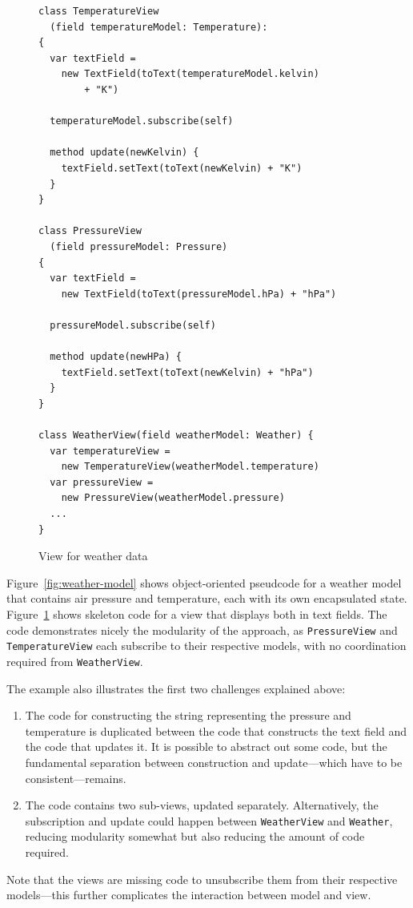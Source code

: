 \documentclass[sigplan,review,screen]{acmart}
\begin{document}
\begin{figure}[tb]
\begin{verbatim}
class TemperatureView
  (field temperatureModel: Temperature):
{
  var textField =
    new TextField(toText(temperatureModel.kelvin)
        + "K")

  temperatureModel.subscribe(self)

  method update(newKelvin) {
    textField.setText(toText(newKelvin) + "K")
  }
}

class PressureView
  (field pressureModel: Pressure)
{
  var textField =
    new TextField(toText(pressureModel.hPa) + "hPa")

  pressureModel.subscribe(self)

  method update(newHPa) {
    textField.setText(toText(newKelvin) + "hPa")
  }
}

class WeatherView(field weatherModel: Weather) {
  var temperatureView =
    new TemperatureView(weatherModel.temperature)
  var pressureView =
    new PressureView(weatherModel.pressure)
  ...
}
\end{verbatim}
  \caption{View for weather data}
  \label{fig:weather-view}
\end{figure}
%
Figure~\ref{fig:weather-model} shows object-oriented pseudcode for a
weather model that contains air pressure and temperature, each with
its own encapsulated state.  Figure~\ref{fig:weather-view} shows
skeleton code for a view that displays both in text fields.  The code
demonstrates nicely the modularity of the approach, as
\texttt{PressureView} and \texttt{TemperatureView} each subscribe to
their respective models, with no coordination required from
\texttt{WeatherView}.

The example also illustrates the first two challenges explained above:
%
\begin{enumerate}
\item The code for constructing the string representing the pressure
  and temperature is duplicated between the code that constructs the
  text field and the code that updates it.  It is possible to abstract
  out some code, but the fundamental separation between construction
  and update---which have to be consistent---remains.
\item The code contains two sub-views, updated separately.
  Alternatively, the subscription and update could happen between
  \texttt{WeatherView} and \texttt{Weather}, reducing modularity
  somewhat but also reducing the amount of code required.
\end{enumerate}
%
Note that the views are missing code to unsubscribe them from their
respective models---this further complicates the interaction between
model and view.
\end{document}

